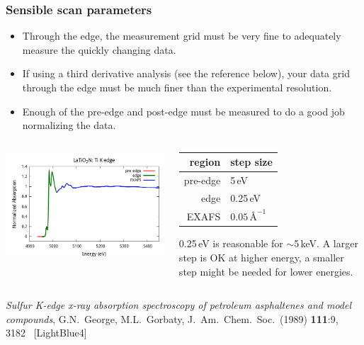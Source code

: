 \documentclass[10pt, xcolor=x11names, compress]{beamer}
\begin{document}
\begin{frame}
  \frametitle{Sensible scan parameters}
  \begin{itemize}
  \item Through the edge, the measurement grid must be very fine to
    adequately measure the quickly changing data.
  \item If using a third derivative analysis (see the reference
    below), your data grid through the edge must be much finer than
    the experimental resolution.
  \item Enough of the pre-edge and post-edge must be measured to do a
    good job normalizing the data.
  \end{itemize}

  \begin{columns}
    \begin{column}{0.5\linewidth}
      \includegraphics[width=\linewidth]{images/scan_params/scan_params.png}
    \end{column}
    \begin{column}{0.5\linewidth}
      \begin{tabular}[h]{rl}
        region & step size\\
        \hline
        \color{Red2}pre-edge & \color{Red2}5\,eV\\
        \color{Green4}edge   & \color{Green4}0.25\,eV\\
        \color{Blue3}EXAFS   & \color{Blue3}$0.05\,\textrm{\AA}^{-1}$\\
      \end{tabular}

      \smallskip

      \small%
      {\color{Green4}0.25\,eV} is reasonable for $\sim$5\,keV.  A
      larger step is OK at higher energy, a smaller step might be
      needed for lower energies.
    \end{column}
  \end{columns}

  \begin{bottomnote}[0.5][19] 
    \textit{Sulfur K-edge x-ray absorption spectroscopy of petroleum
    asphaltenes and model compounds},
    G.N.\ George, M.L.\ Gorbaty,
    J.\ Am.\ Chem.\ Soc.\ (1989) \textbf{111}:9, 3182~
    [LightBlue4]
  \end{bottomnote}
\end{frame}
\end{document}
